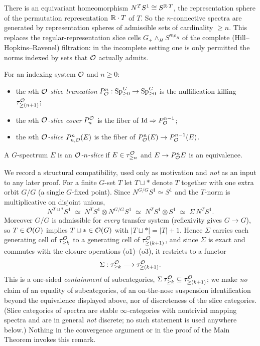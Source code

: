 \begin{qfiveremark}
There is an equivariant homeomorphism $N^T S^1\cong S^{\mathbb{R}\cdot T}$, the
representation sphere of the permutation representation $\mathbb{R}\cdot T$ of $T$. So the
$n$-connective spectra are generated by representation spheres of admissible
sets of cardinality $\ge n$. This replaces the regular-representation slice cells
$G_+\wedge_H S^{m\rho_H}$ of the complete (Hill--Hopkins--Ravenel) filtration:
in the incomplete setting one is only permitted the norms indexed by sets that
$\mathcal{O}$ actually admits.
\end{qfiveremark}

\begin{qfivedefinition}
For an indexing system $\mathcal{O}$ and $n\ge 0$:
\begin{itemize}\setlength\itemsep{2pt}
\item the $n$th \emph{$\mathcal{O}$-slice truncation} $P^n_{\mathcal{O}}:\mathrm{Sp}^G_{\ge 0}\to
\mathrm{Sp}^G_{\ge 0}$ is the nullification killing $\tau^{\mathcal{O}}_{\ge(n+1)}$;
\item the $n$th \emph{$\mathcal{O}$-slice cover} $P^{\mathcal{O}}_n$ is the fiber of
$\mathrm{Id}\Rightarrow P^{n-1}_{\mathcal{O}}$;
\item the $n$th \emph{$\mathcal{O}$-slice} $P^n_{n,\mathcal{O}}(E)$ is the fiber of
$P^n_{\mathcal{O}}(E)\to P^{n-1}_{\mathcal{O}}(E)$.
\end{itemize}
A $G$-spectrum $E$ is an \emph{$\mathcal{O}$-$n$-slice} if $E\in\tau^{\mathcal{O}}_{\ge n}$ and
$E\to P^n_{\mathcal{O}} E$ is an equivalence.
\end{qfivedefinition}

\begin{qfiveremark}\label{rem:susp}
We record a structural compatibility, used only as motivation and \emph{not} as
an input to any later proof. For a finite $G$-set $T$ let $T\sqcup\ast$ denote
$T$ together with one extra orbit $G/G$ (a single $G$-fixed point). Since
$N^{G/G}S^1\simeq S^1$ and the $T$-norm is multiplicative on disjoint unions,
\[
N^{T\sqcup\ast}S^1\;\simeq\;N^{T}S^1\otimes N^{G/G}S^1\;\simeq\;N^{T}S^1\otimes S^1
\;\simeq\;\Sigma\, N^{T}S^1 .
\]
Moreover $G/G$ is admissible for \emph{every} transfer system (reflexivity gives
$G\to G$), so $T\in\mathcal{O}(G)$ implies $T\sqcup\ast\in\mathcal{O}(G)$ with
$|T\sqcup\ast|=|T|+1$. Hence $\Sigma$ carries each generating cell of
$\tau^{\mathcal{O}}_{\ge k}$ to a generating cell of $\tau^{\mathcal{O}}_{\ge(k+1)}$, and since
$\Sigma$ is exact and commutes with the closure operations (o1)--(o3), it
restricts to a functor
\[
\Sigma:\tau^{\mathcal{O}}_{\ge k}\longrightarrow\tau^{\mathcal{O}}_{\ge(k+1)} .
\]
This is a one-sided \emph{containment} of subcategories, $\Sigma\,\tau^{\mathcal{O}}_{\ge
k}\subseteq\tau^{\mathcal{O}}_{\ge(k+1)}$; we make \emph{no} claim of an equality of
subcategories, of an on-the-nose suspension identification beyond the
equivalence displayed above, nor of discreteness of the slice categories. (Slice
categories of spectra are stable $\infty$-categories with nontrivial mapping
spectra and are in general \emph{not} discrete; no such statement is used
anywhere below.) Nothing in the convergence argument or in the proof of the Main
Theorem invokes this remark.
\end{qfiveremark}

